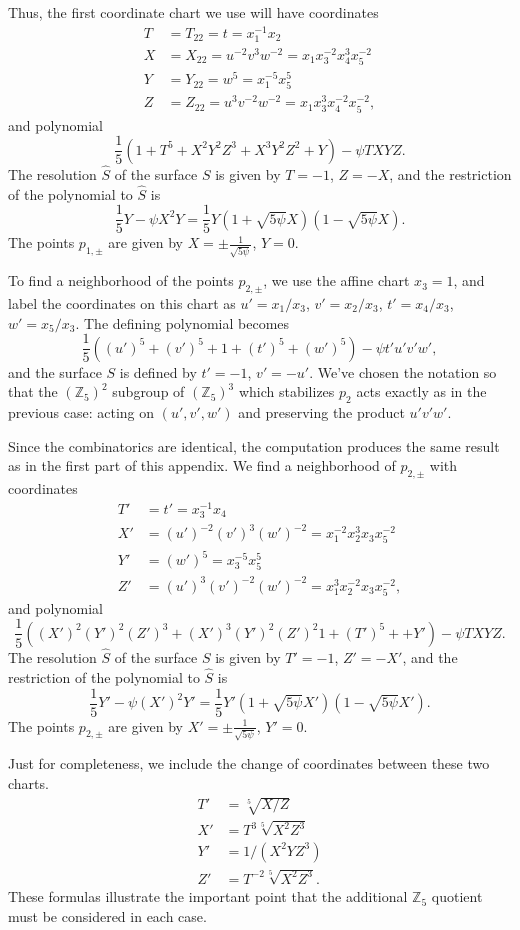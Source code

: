 Thus, the first coordinate chart we use will have coordinates
\begin{align*} 
T &= T_{22} = t = x_1^{-1}x_2\\
X &= X_{22} = u^{-2}v^{3}w^{-2} = x_1x_3^{-2}x_4^3x_5^{-2}\\
Y &= Y_{22} = w^{5} = x_1^{-5}x_5^5\\
Z &= Z_{22} = u^{3}v^{-2}w^{-2} = x_1x_3^3x_4^{-2}x_5^{-2},
\end{align*}
and polynomial
\[ \frac15\left(1+T^5
+X^2 Y^2 Z^{3}
+X^{3} Y^2 Z^{2}
+ Y
\right)-\psi TXYZ.
\]
The resolution $\widehat{S}$ of the surface $S$ is given by $T=-1$,
$Z=-X$, and the restriction of the polynomial to $\widehat{S}$ is
\[ \frac15Y-\psi X^2Y=\frac15Y(1+\sqrt{5\psi}X)(1-\sqrt{5\psi}X).
\]
The points $p_{1,\pm}$ are given by $X=\pm\frac1{\sqrt{5\psi}}$, $Y=0$.

To find a neighborhood of the points $p_{2,\pm}$, we use the affine chart
$x_3=1$, and label the coordinates on this chart as
$u'=x_1/x_3$, $v'=x_2/x_3$, $t'=x_4/x_3$, $w'=x_5/x_3$. The defining
polynomial becomes
\[ \frac15\left((u')^5+(v')^5+1+(t')^5+(w')^5
\right) -\psi t'u'v'w',
\]
and the surface $S$ is defined by $t'=-1$, $v'=-u'$.  We've chosen
the notation so that the $(\mathbb{Z}_5)^2$ subgroup of 
$(\mathbb{Z}_5)^3$ which stabilizes $p_2$ acts exactly as in the
previous case: acting on $(u',v',w')$ and preserving the product
$u'v'w'$.

Since the combinatorics are identical, the computation produces the
same result as in the first part of this appendix.  We find a neighborhood
of $p_{2,\pm}$ with coordinates
\begin{align*} 
T' &= t' = x_3^{-1}x_4\\
X' &= (u')^{-2}(v')^{3}(w')^{-2} = x_1^{-2}x_2^3x_3x_5^{-2}\\
Y' &= (w')^{5} = x_3^{-5}x_5^5\\
Z' &= (u')^{3}(v')^{-2}(w')^{-2} = x_1^3x_2^{-2}x_3x_5^{-2},
\end{align*}
and polynomial
\[ \frac15\left(
(X')^2 (Y')^2 (Z')^{3}+(X')^{3} (Y')^2 (Z')^{2}
1+(T')^5+
+ Y'
\right)-\psi TXYZ.
\]
The resolution $\widehat{S}$ of the surface $S$ is given by $T'=-1$,
$Z'=-X'$, and the restriction of the polynomial to $\widehat{S}$ is
\[ \frac15Y'-\psi (X')^2Y'=\frac15Y'(1+\sqrt{5\psi}X')(1-\sqrt{5\psi}X').
\]
The points $p_{2,\pm}$ are given by $X'=\pm\frac1{\sqrt{5\psi}}$, $Y'=0$.

Just for completeness, we include the change of coordinates between these
two charts.
\begin{align*}
T' &= \sqrt[5]{X/Z}\\
X' &= T^3 \sqrt[5]{X^2Z^3}\\
Y' &= 1/(X^2YZ^3)\\
Z' &= T^{-2} \sqrt[5]{X^2Z^3}.
\end{align*}
These formulas illustrate the important point that the additional
$\mathbb{Z}_5$ quotient must be considered in each case.



